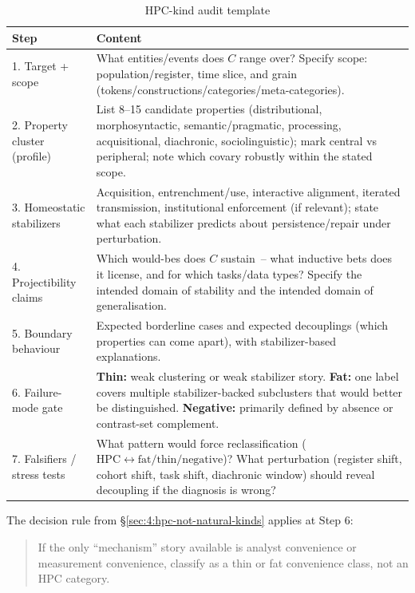 \begin{table}[H]
\centering
\caption{HPC-kind audit template}
\label{tab:audit-template}
\small
\begin{tabular}{@{}p{3.5cm}p{10.5cm}@{}}
\toprule
\textbf{Step} & \textbf{Content} \\
\midrule
1. Target + scope & What entities/events does $C$ range over? Specify scope: population/register, time slice, and grain (tokens/constructions/categories/meta-categories). \\[6pt]
2. Property cluster (profile) & List 8--15 candidate properties (distributional, morphosyntactic, semantic/pragmatic, processing, acquisitional, diachronic, sociolinguistic); mark central vs peripheral; note which covary robustly within the stated scope. \\[6pt]
3. Homeostatic stabilizers & Acquisition, entrenchment/use, interactive alignment, iterated transmission, institutional enforcement (if relevant); state what each stabilizer predicts about persistence/repair under perturbation. \\[6pt]
4. Projectibility claims & Which would-bes does $C$ sustain~-- what inductive bets does it license, and for which tasks/data types? Specify the intended domain of stability and the intended domain of generalisation. \\[6pt]
5. Boundary behaviour & Expected borderline cases and expected decouplings (which properties can come apart), with stabilizer-based explanations. \\[6pt]
6. Failure-mode gate & \textbf{Thin:} weak clustering or weak stabilizer story. \textbf{Fat:} one label covers multiple stabilizer-backed subclusters that would better be distinguished. \textbf{Negative:} primarily defined by absence or contrast-set complement. \\[6pt]
7. Falsifiers / stress tests & What pattern would force reclassification ($\mathrm{HPC} \leftrightarrow \text{fat/thin/negative}$)? What perturbation (register shift, cohort shift, task shift, diachronic window) should reveal decoupling if the diagnosis is wrong? \\
\bottomrule
\end{tabular}
\end{table}

The decision rule from §\ref{sec:4:hpc-not-natural-kinds} applies at Step 6:

\begin{quote}
If the only \enquote{mechanism} story available is analyst convenience or measurement convenience, classify as a thin or fat convenience class, not an HPC category.
\end{quote}

